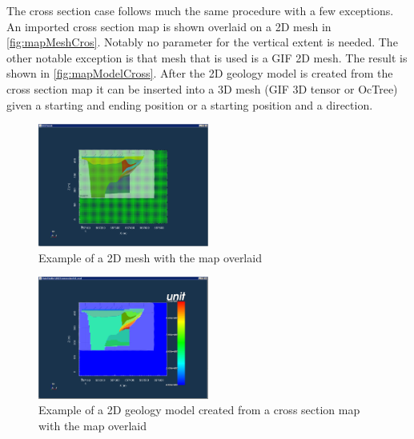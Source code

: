 The cross section case follows much the same procedure with a few exceptions. An imported cross section map is shown overlaid on a 2D mesh in \autoref{fig:mapMeshCros}. Notably no parameter for the vertical extent is needed. The other notable exception is that mesh that is used is a \ac{GIF} 2D mesh. The result is shown in \autoref{fig:mapModelCross}.  After the 2D geology model is created from the cross section map it can be inserted into a 3D mesh (\ac{GIF} 3D tensor or OcTree) given a starting and ending position or a starting position and a direction.
\begin{figure} [h]
    \centering
    \includegraphics[width=0.5\textwidth]{images/GUI/mapMeshCross.PNG}
    \caption{Example of a 2D mesh with the map overlaid}
    \label{fig:mapMeshCross}
\end{figure}

\begin{figure} [h]
    \centering
    \includegraphics[width=0.5\textwidth]{images/GUI/mapModelCross.PNG}
    \caption{Example of a 2D geology model created from a cross section map with the map overlaid}
    \label{fig:mapModelCross}
\end{figure}






%

\endinput

 Interestingly, the assumption that all magnetizations are in the same direction also assumes that all Koenigsberger ratios are equal.

Any text after an \endinput is ignored.
You could put scraps here or things in progress.
